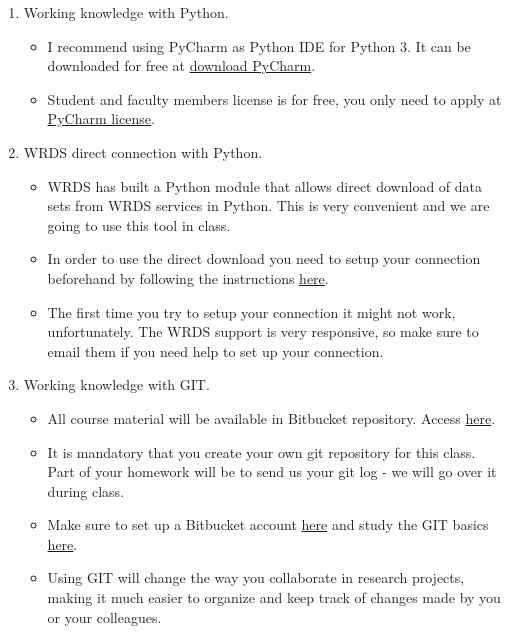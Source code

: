 \documentclass[12pts]{article}
\begin{document}
\begin{enumerate}
	\item Working knowledge with Python.
	\begin{itemize}
		\item I recommend using PyCharm as Python IDE for Python 3. It can be downloaded for free at \href{https://www.jetbrains.com/pycharm/download/#section=windows}{download PyCharm}.
		\item Student and faculty members license is for free, you only need to apply at \href{https://www.jetbrains.com/student/}{PyCharm license}. 
	\end{itemize}
    \item WRDS direct connection with Python.
    \begin{itemize}
    	\item WRDS has built a Python module that allows direct download of data sets from WRDS services in Python. This is very convenient and we are going to use this tool in class.
    	\item In order to use the direct download you need to setup your connection beforehand by following the instructions \href{https://wrds-www.wharton.upenn.edu/pages/support/programming-wrds/programming-python/python-from-your-computer/}{here}.  
    	\item The first time you try to setup your connection it might not work, unfortunately. The WRDS support is very responsive, so make sure to email them if you need help to set up your connection. 
    \end{itemize}
   \item Working knowledge with GIT.
	\begin{itemize}
		\item All course material will be available in Bitbucket repository. Access \href{https://bitbucket.org/liramota/bdatacourse/src/master/}{here}.
		\item It is mandatory that you create your own git repository for this class. Part of your homework will be to send us your git log - we will go over it during class.
		\item Make sure to set up a Bitbucket account \href{https://bitbucket.org/account/signup/}{here} and study the GIT basics \href{https://www.atlassian.com/git/tutorials/what-is-version-control}{here}.
		\item Using GIT will change the way you collaborate in research projects, making it much easier to organize and keep track of changes made by you or your colleagues.
	\end{itemize}

\end{enumerate}
\end{document}
